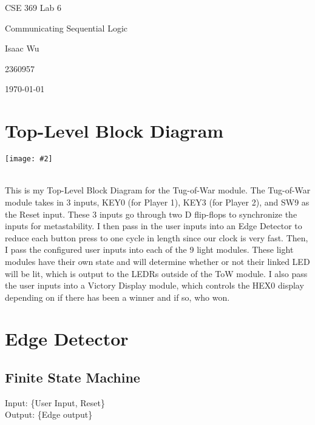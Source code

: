 \documentclass{article}
\date{}
\newenvironment{solution}{\begin{mdframed}[style=SolutionFrame]}{\end{mdframed}}
\newcommand{\img}[2][0.9]{
    \begin{minipage}[t]{0.9\linewidth}
        \begin{center}
            \texttt{[image: \#2]}
        \end{center}
    \end{minipage}
}
\begin{document}
    \begin{titlepage}
        \centering
        \null
        \vspace{5cm}
        {\Huge CSE 369 Lab 6\par}
        \vspace{0.5cm}
        {\Large Communicating Sequential Logic \par}
        \vfill
        {\hfill \Large Isaac Wu \par}
        {\hfill \large 2360957 \par}
        {\hfill \large \today \par}
    \end{titlepage}

\section{Top-Level Block Diagram}
    \begin{solution}
        \img{block_diagram.png} \\
        This is my Top-Level Block Diagram for the Tug-of-War module. The Tug-of-War module takes in 3 inputs, KEY0 (for Player 1), KEY3 (for Player 2), and SW9 as the Reset input. These 3 inputs go through two D flip-flops to synchronize the inputs for metastability. I then pass in the user inputs into an Edge Detector to reduce each button press to one cycle in length since our clock is very fast. Then, I pass the configured user inputs into each of the 9 light modules. These light modules have their own state and will determine whether or not their linked LED will be lit, which is output to the LEDRs outside of the ToW module. I also pass the user inputs into a Victory Display module, which controls the HEX0 display depending on if there has been a winner and if so, who won.
    \end{solution}

\newpage
\section{Edge Detector}
    \subsection{Finite State Machine}
    \begin{solution}
        Input: \{User Input, Reset\} \\
        Output: \{Edge output\}
        \begin{center}
        \end{center}
    \end{solution}
\end{document}
